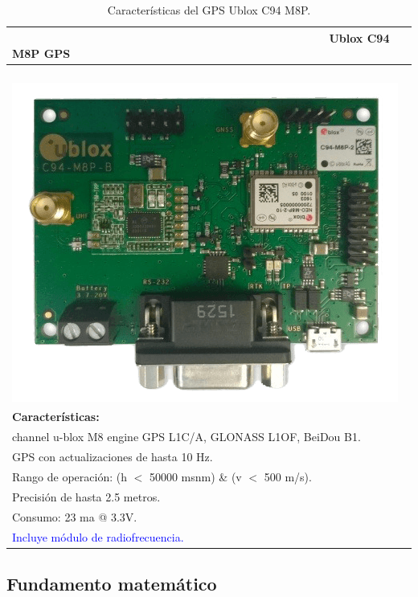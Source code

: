 \begin{table}[!htb]
\begin{center}
\caption{Características del GPS Ublox C94 M8P.}
\begin{tabular}{|l|}
	\hline
	\ \ \ \ \ \ \ \ \ \ \ \ \ \ \ \ \ \ \ \ \ \ \ \ \ \ \ \ \ \ \ \ \ \ \ \ \ \ \ \ \ \ \ \ \ \ \ \ \ \textbf{Ublox C94 M8P GPS}\\
	\hline
	      \ \ \ \ \ \ \ \ \ \ \ \ \ \ \ \ \ \ \ \ \ \ \ \ \ \ \ \ \ \ \ \ \ \ \ \ \ \ \ \ \includegraphics[width=0.25\linewidth]{Figures/ublox}\footnotemark
	\label{fig:ubx} \\
	\textbf{Características: }\\

		\tabitem 72 channel u-blox M8 engine GPS L1C/A, GLONASS L1OF, BeiDou B1.\\
		\tabitem GPS con actualizaciones de hasta 10 Hz.\\
		\tabitem Rango de operación: (h $<$ 50000 msnm) \& (v $<$ 500 m/s).\\
		\tabitem Precisión de hasta 2.5 metros.\\
		\tabitem Consumo: 23 ma @ 3.3V.\\
		\tabitem \textcolor{blue}{Incluye módulo de radiofrecuencia.}\\
	\hline
\end{tabular}
\end{center}
\end{table}


\FloatBarrier

\newpage

\subsection{Fundamento matemático}

